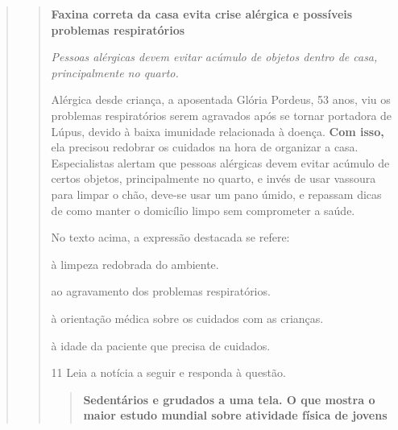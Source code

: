 \begin{quote}
\begin{quote}
\textbf{Faxina correta da casa evita crise alérgica e possíveis problemas
respiratórios}

\textit{Pessoas alérgicas devem evitar acúmulo de objetos dentro de casa,
principalmente no quarto.}

Alérgica desde criança, a aposentada Glória Pordeus, 53 anos, viu os
problemas respiratórios serem agravados após se tornar portadora de
Lúpus, devido à baixa imunidade relacionada à doença. \textbf{Com isso,}
ela precisou redobrar os cuidados na hora de organizar a casa.
Especialistas alertam que pessoas alérgicas devem evitar acúmulo de
certos objetos, principalmente no quarto, e invés de usar vassoura para
limpar o chão, deve-se usar um pano úmido, e repassam dicas de como
manter o domicílio limpo sem comprometer a saúde.


No texto acima, a expressão destacada se refere:

\begin{escolha}
  
  \item à limpeza redobrada do ambiente.
  
  \item ao agravamento dos problemas respiratórios.
  
  \item à orientação médica sobre os cuidados com as crianças.
  
  \item à idade da paciente que precisa de cuidados.

\end{escolha}


\num{11} Leia a notícia a seguir e responda à questão.

\begin{quote}

\textbf{Sedentários e grudados a uma tela. O
que mostra o maior estudo mundial sobre atividade física de
jovens}


\end{quote}
\end{quote}
\end{quote}
